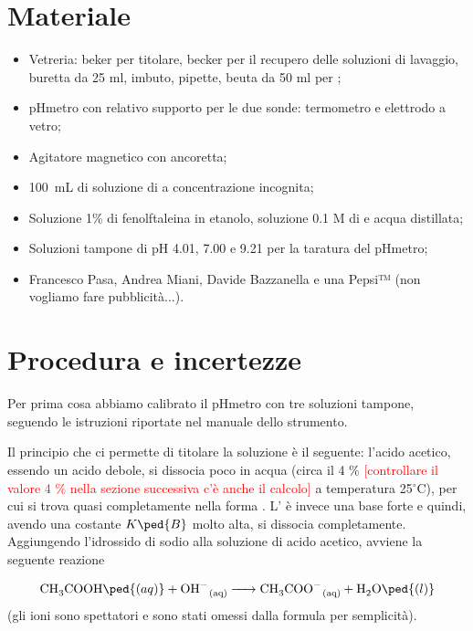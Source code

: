 \section*{Materiale}

\begin{itemize}
        \setlength{\parskip}{0pt}
        \item{Vetreria: beker per titolare, becker per il recupero delle soluzioni di lavaggio,
            buretta da 25 ml, imbuto, pipette, beuta da 50 ml per ;}
        \item{pHmetro con relativo supporto per le due sonde: termometro e elettrodo a vetro;}
        \item{Agitatore magnetico con ancoretta;}
        \item{\SI{100}{\milli\liter} di soluzione di  a concentrazione incognita;}
        \item{Soluzione 1\% di fenolftaleina in etanolo, soluzione 0.1 M di  e acqua distillata;}
        \item{Soluzioni tampone di pH 4.01, 7.00 e 9.21 per la taratura del pHmetro;}
        \item{Francesco Pasa, Andrea Miani, Davide Bazzanella e una Pepsi™ (non vogliamo fare pubblicità...).}
\end{itemize}

\section*{Procedura e incertezze}

Per prima cosa abbiamo calibrato il pHmetro con tre soluzioni tampone,
seguendo le istruzioni riportate nel manuale dello strumento.

Il principio che ci permette di titolare la soluzione è il seguente: l'acido acetico, essendo un acido debole,
si dissocia poco in acqua (circa il 4 \% \textcolor{red}{[controllare il valore 4 \% nella sezione successiva
c'è anche il calcolo]} a temperatura 25$^\circ$C),
per cui si trova quasi completamente nella forma .
L' è invece una base forte e quindi, avendo una costante $K\ped{B}$ molto alta,
si dissocia completamente. Aggiungendo l'idrossido di sodio alla soluzione di acido acetico,
avviene la seguente reazione

\begin{equation}
    \ce{CH3COOH\ped{(aq)} + OH- _{(aq)} -> CH3COO- _{(aq)} + H2O\ped{(l)}}
    \label{eq:reaz}
\end{equation}
%
(gli ioni  sono spettatori e sono stati omessi dalla formula per semplicità).

